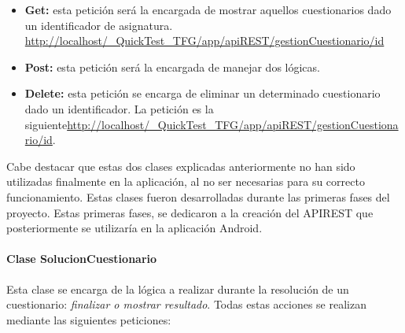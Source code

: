 \begin{itemize}

	\item \textbf{Get:} esta petición será la encargada de mostrar aquellos cuestionarios dado un identificador de asignatura. \url{http://localhost/_QuickTest_TFG/app/apiREST/gestionCuestionario/id}
	\item \textbf{Post:} esta petición será la encargada de manejar dos lógicas.
	
	\item \textbf{Delete:} esta petición se encarga de eliminar un determinado cuestionario dado un identificador. La petición es la siguiente\url{http://localhost/_QuickTest_TFG/app/apiREST/gestionCuestionario/id}.

\end{itemize}


Cabe destacar que estas dos clases explicadas anteriormente no han sido utilizadas finalmente en la aplicación, al no ser necesarias para su correcto funcionamiento. Estas clases fueron desarrolladas durante las primeras fases del proyecto. Estas primeras fases, se dedicaron a la creación del APIREST que posteriormente se utilizaría en la aplicación Android.

\paragraph{Clase SolucionCuestionario}

Esta clase se encarga de la lógica a realizar durante la resolución de un cuestionario: \emph{finalizar o mostrar resultado}.
Todas estas acciones se realizan mediante las siguientes peticiones:

